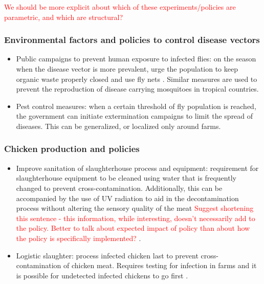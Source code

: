 \textcolor{red}{We should be more explicit about which of these experiments/policies are parametric, and which are structural?}
\subsubsection{Environmental factors and policies to control disease vectors}
\begin{itemize}
    \item Public campaigns to prevent human exposure to infected flies: on the season when the disease vector is more prevalent, urge the population to keep organic waste properly closed and use fly nets \parencite{hald_use_2007}. Similar measures are used to prevent the reproduction of disease carrying mosquitoes in tropical countries. %
    \item Pest control measures: when a certain threshold of fly population is reached, the government can initiate extermination campaigns to limit the spread of diseases. This can be generalized, or localized only around farms.
\end{itemize}

\subsubsection{Chicken production and policies}
\begin{itemize}
    \item Improve sanitation of slaughterhouse process and equipment: requirement for slaughterhouse equipment to be cleaned using water that is frequently changed to prevent cross-contamination. Additionally, this can be accompanied by the use of UV radiation to aid in the decontamination process without altering the sensory quality of the meat \textcolor{red}{Suggest shortening this sentence - this information, while interesting, doesn't necessarily add to the policy. Better to talk about expected impact of policy than about how the policy is specifically implemented?} \parencite{isohanni_use_2009}.
    \item Logistic slaughter: process infected chicken last to prevent cross-contamination of chicken meat. Requires testing for infection in farms and it is possible for undetected infected chickens to go first \parencite{evers_predicted_2004}. 
\end{itemize}

